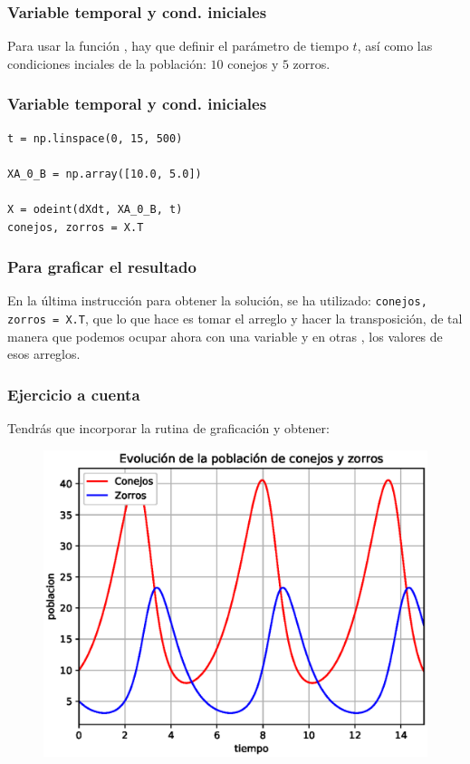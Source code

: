 \begin{frame}[fragile]
\frametitle{Variable temporal y cond. iniciales}
Para usar la función , hay que definir el parámetro de tiempo $t$, así como las condiciones inciales de la población: $10$ conejos y $5$ zorros.
\end{frame}
\begin{frame}[fragile]
\frametitle{Variable temporal y cond. iniciales}
\begin{lstlisting}[caption=Código para las condiciones iniciales, style=codigopython]
t = np.linspace(0, 15, 500)
              
XA_0_B = np.array([10.0, 5.0])         
            
X = odeint(dXdt, XA_0_B, t)
conejos, zorros = X.T
\end{lstlisting}
\end{frame}
\begin{frame}[fragile]
\frametitle{Para graficar el resultado}
En la última instrucción para obtener la solución, se ha utilizado: \verb|conejos, zorros = X.T|, que lo que hace es tomar el arreglo  y hacer la transposición, de tal manera que podemos ocupar ahora con una variable  y en otras , los valores de esos arreglos.
\end{frame}
\begin{frame}
\frametitle{Ejercicio a cuenta}
Tendrás que incorporar la rutina de graficación y obtener:
\begin{figure}[h!]
    \centering
    \includegraphics[scale=0.5]{Imagenes/ejercicio_odeint_05_sistema_lotka-volterra_01.eps} 
\end{figure}
\end{frame}
